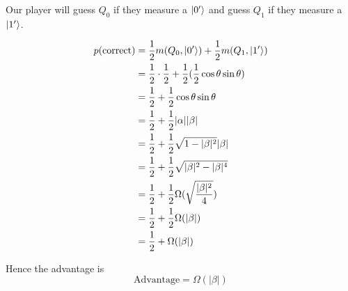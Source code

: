 Our player will guess $Q_0$ if they measure a $\lvert0'\rangle$ and guess $Q_1$ if they measure a $\lvert1'\rangle$.

\begin{align*}
    p(\text{correct}) &= \frac{1}{2} m(Q_0, \lvert0'\rangle) + \frac{1}{2} m(Q_1, \lvert1'\rangle)\\
     &= \frac{1}{2}\cdot \frac{1}{2} + \frac{1}{2} (\frac{1}{2} \cos\theta \sin\theta)\\
     &= \frac{1}{2} + \frac{1}{2} \cos\theta \sin\theta\\
     &= \frac{1}{2} + \frac{1}{2} |\alpha| |\beta|\\
     &= \frac{1}{2} + \frac{1}{2} \sqrt{1-|\beta|^2} |\beta|\\
     &= \frac{1}{2} + \frac{1}{2} \sqrt{|\beta|^2-|\beta|^4}\\
     &= \frac{1}{2} + \frac{1}{2} \Omega(\sqrt{\frac{|\beta|^2}{4}})\\
     &= \frac{1}{2} + \frac{1}{2} \Omega(|\beta|)\\
     &= \frac{1}{2} + \Omega(|\beta|)\\
\end{align*}

Hence the advantage is
\[
    \text{Advantage}=\Omega(|\beta|)
\]
